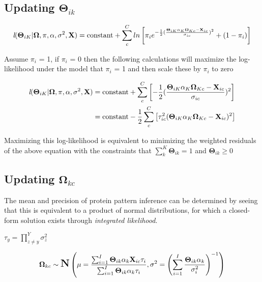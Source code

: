 \documentclass[12pt]{article}
\begin{document}
\subsection*{Updating $\mathbf{\Theta}_{ik}$}

\begin{align}
\textit{l}(\mathbf{\Theta}_{iK} | \mathbf{\Omega}, \pi, \alpha, \sigma^{2}, \textbf{X}) &= \text{constant} + \sum_{c}^{C}ln\left[\pi_{i}e^{-\frac{1}{2}(\frac{\mathbf{\Theta}_{iK}\alpha_{K}\mathbf{\Omega}_{Kc} - \textbf{X}_{ic}}{\sigma_{ic}})^2} + (1-\pi_{i})\right]\notag\\
\end{align}

Assume $\pi_{i}$ = 1, if $\pi_{i}$ = 0 then the following calculations will maximize the log-likelihood under the model that $\pi_{i}$ = 1 and then scale these by $\pi_{i}$ to zero

\begin{align}
\textit{l}(\mathbf{\Theta}_{iK} | \mathbf{\Omega}, \pi, \alpha, \sigma^{2}, \textbf{X}) &= \text{constant} + \sum_{c}^{C}\left[{-\frac{1}{2}(\frac{\mathbf{\Theta}_{iK}\alpha_{K}\mathbf{\Omega}_{Kc} - \textbf{X}_{ic}}{\sigma_{ic}})^2}\right]\notag\\
 &= \text{constant} -\frac{1}{2}\sum_{c}^{C}\left[{\tau_{ic}^{2}(\mathbf{\Theta}_{iK}\alpha_{K}\mathbf{\Omega}_{Kc} - \textbf{X}_{ic})^2}\right]\notag\\
\end{align}

Maximizing this log-likelihood is equivalent to minimizing the weighted residuals of the above equation with the constraints that $\sum_{k}^{K}\mathbf{\Theta}_{ik} = 1$ and $\mathbf{\Theta}_{ik} \ge 0$
\subsection*{Updating $\mathbf{\Omega}_{kc}$}

The mean and precision of protein pattern inference can be determined by seeing that this is equivalent to a product of normal distributions, for which a closed-form solution exists through \textit{integrated likelihood}.

$\tau_{y} = \prod_{z \neq y}^{Y}\sigma^{2}_{z}$

\begin{align}
\mathbf{\Omega}_{kc} \sim \mbox{\Large \textbf{N}}\left(\mu = \frac{\sum_{i = 1}^{I}\mathbf{\Theta}_{ik}\alpha_{k}\textbf{X}_{ic}\tau_{i}}{\sum_{i = 1}^{I}\mathbf{\Theta}_{ik}\alpha_{k}\tau_{i}}, \sigma^{2} =  \left(\sum_{i = 1}^{I}\frac{\mathbf{\Theta}_{ik}\alpha_{k}}{\sigma^{2}_{i}}\right)^{-1} \right)
\end{align}
\end{document}
